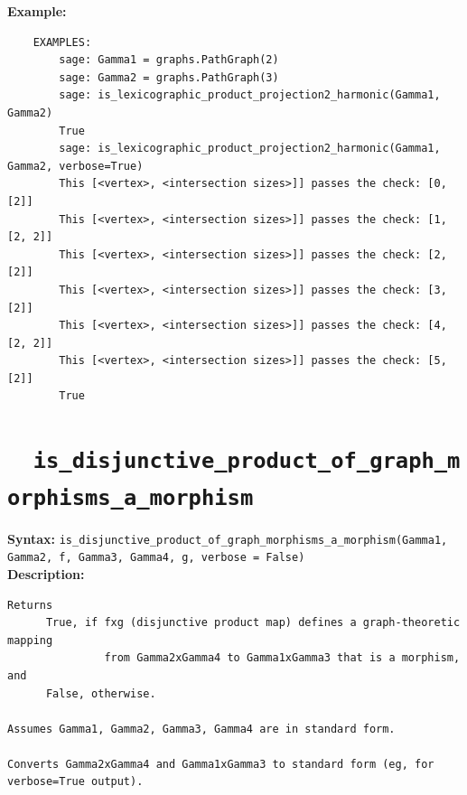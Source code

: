 \documentclass{article}
\begin{document}
\textbf{Example:}
\begin{verbatim}
    EXAMPLES:
        sage: Gamma1 = graphs.PathGraph(2)
        sage: Gamma2 = graphs.PathGraph(3)
        sage: is_lexicographic_product_projection2_harmonic(Gamma1, Gamma2) 
        True
        sage: is_lexicographic_product_projection2_harmonic(Gamma1, Gamma2, verbose=True) 
        This [<vertex>, <intersection sizes>]] passes the check: [0, [2]]
        This [<vertex>, <intersection sizes>]] passes the check: [1, [2, 2]]
        This [<vertex>, <intersection sizes>]] passes the check: [2, [2]]
        This [<vertex>, <intersection sizes>]] passes the check: [3, [2]]
        This [<vertex>, <intersection sizes>]] passes the check: [4, [2, 2]]
        This [<vertex>, <intersection sizes>]] passes the check: [5, [2]]
        True
\end{verbatim}

\section{\tt \ \ is\_disjunctive\_product\_of\_graph\_morphisms\_a\_morphism}

\textbf{Syntax:}
\verb}is_disjunctive_product_of_graph_morphisms_a_morphism(Gamma1, Gamma2, f, Gamma3, Gamma4, g, verbose = False)}\\

\textbf{Description:}
\begin{verbatim}
Returns
      True, if fxg (disjunctive product map) defines a graph-theoretic mapping
               from Gamma2xGamma4 to Gamma1xGamma3 that is a morphism,
and
      False, otherwise. 

Assumes Gamma1, Gamma2, Gamma3, Gamma4 are in standard form.

Converts Gamma2xGamma4 and Gamma1xGamma3 to standard form (eg, for verbose=True output).
\end{verbatim}
\end{document}
